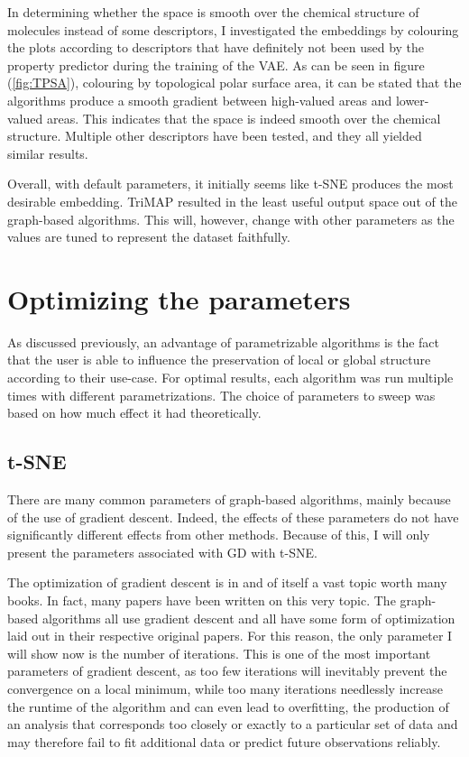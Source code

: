 In determining whether the space is smooth over the chemical structure of molecules instead of some descriptors, I investigated the embeddings by colouring the plots according to descriptors that have definitely not been used by the property predictor during the training of the VAE. As can be seen in figure (\ref{fig:TPSA}), colouring by topological polar surface area, it can be stated that the algorithms produce a smooth gradient between high-valued areas and lower-valued areas. This indicates that the space is indeed smooth over the chemical structure. Multiple other descriptors have been tested, and they all yielded similar results.

Overall, with default parameters, it initially seems like t-SNE produces the most desirable embedding. TriMAP resulted in the least useful output space out of the graph-based algorithms. This will, however, change with other parameters as the values are tuned to represent the dataset faithfully.

\section{Optimizing the parameters}\label{sec:optimizing-the-parameters}

As discussed previously, an advantage of parametrizable algorithms is the fact that the user is able to influence the preservation of local or global structure according to their use-case. For optimal results, each algorithm was run multiple times with different parametrizations. The choice of parameters to sweep was based on how much effect it had theoretically.

\subsection{t-SNE}

There are many common parameters of graph-based algorithms, mainly because of the use of gradient descent. Indeed, the effects of these parameters do not have significantly different effects from other methods. Because of this, I will only present the parameters associated with GD with t-SNE.

The optimization of gradient descent is in and of itself a vast topic worth many books. In fact, many papers have been written on this very topic. The graph-based algorithms all use gradient descent and all have some form of optimization laid out in their respective original papers. For this reason, the only parameter I will show now is the number of iterations. This is one of the most important parameters of gradient descent, as too few iterations will inevitably prevent the convergence on a local minimum, while too many iterations needlessly increase the runtime of the algorithm and can even lead to overfitting, the production of an analysis that corresponds too closely or exactly to a particular set of data and may therefore fail to fit additional data or predict future observations reliably.

